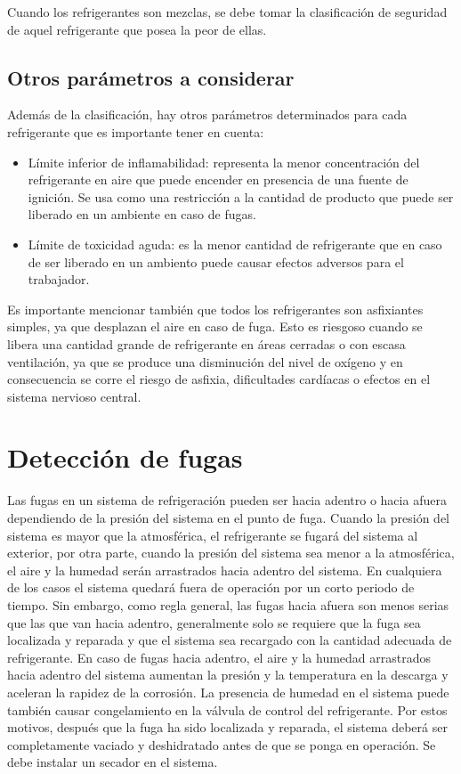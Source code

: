 	Cuando los refrigerantes son mezclas, se debe tomar la clasificación de seguridad de aquel refrigerante que posea la peor de ellas.

	\subsection{Otros parámetros a considerar}

	Además de la clasificación, hay otros parámetros determinados para cada refrigerante que es importante tener en cuenta:

	\begin{itemize}
		\item Límite inferior de inflamabilidad: representa la menor concentración del refrigerante en aire que puede encender en presencia de una fuente de ignición. Se usa como una restricción a la cantidad de producto que puede ser liberado en un ambiente en caso de fugas.
		\item Límite de toxicidad aguda: es la menor cantidad de refrigerante que en caso de ser liberado en un ambiento puede causar efectos adversos para el trabajador.
	\end{itemize}

	Es importante mencionar también que todos los refrigerantes son asfixiantes simples, ya que desplazan el aire en caso de fuga. Esto es riesgoso cuando se libera una cantidad grande de refrigerante en áreas cerradas o con escasa ventilación, ya que se produce una disminución del nivel de oxígeno y en consecuencia se corre el riesgo de asfixia, dificultades cardíacas o efectos en el sistema nervioso central.



	\section{Detección de fugas}
	
	Las fugas en un sistema de refrigeración pueden ser hacia adentro o hacia afuera dependiendo de la presión del sistema en el punto de fuga. Cuando la presión del sistema es mayor que la atmosférica, el refrigerante se fugará del sistema al exterior, por otra parte, cuando la presión del sistema sea menor a la atmosférica, el aire y la humedad serán arrastrados hacia adentro del sistema. En cualquiera de los casos el sistema quedará fuera de operación por un corto periodo de tiempo. Sin embargo, como regla general, las fugas hacia afuera son menos serias que las que van hacia adentro, generalmente solo se requiere que la fuga sea localizada y reparada y que el sistema sea recargado con la cantidad adecuada de refrigerante.  En caso de fugas hacia adentro, el aire y la humedad arrastrados hacia adentro del sistema aumentan la presión y la temperatura en la descarga y aceleran la rapidez de la corrosión. La presencia de humedad en el sistema puede también causar congelamiento en la válvula de control del refrigerante. Por estos motivos, después que la fuga ha sido localizada y reparada, el sistema deberá ser completamente vaciado y deshidratado antes de que se ponga en operación. Se debe instalar un secador en el sistema.

